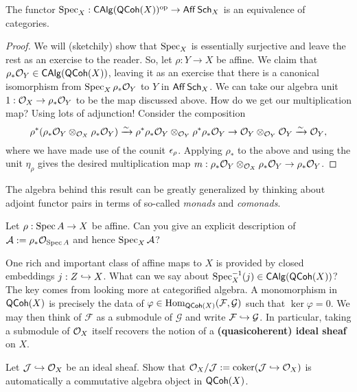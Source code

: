 \documentclass[11pt]{article}
\renewcommand{\AA}{\mathcal{A}}
\renewcommand{\F}{\mathcal{F}}
\newcommand{\G}{\mathcal{G}}
\newcommand{\J}{\mathcal{J}}
\renewcommand{\phi}{\varphi}
\begin{document}
\begin{theorem}
The functor $\operatorname{Spec}_X: \operatorname{\mathsf{CAlg}}(\operatorname{\mathsf{QCoh}}(X))^{\operatorname{op}}\to\operatorname{\mathsf{Aff}}\operatorname{\mathsf{Sch}}_X$ is an equivalence of categories.
\end{theorem}

\begin{proof}
We will (sketchily) show that $\operatorname{Spec}_X$ is essentially surjective and leave the rest as an exercise to the reader. So, let $\rho: Y\to X$ be affine. We claim that $\rho_*\mathcal{O}_Y\in\operatorname{\mathsf{CAlg}}(\operatorname{\mathsf{QCoh}}(X))$, leaving it as an exercise that there is a canonical isomorphism from $\operatorname{Spec}_X\rho_*\mathcal{O}_Y$ to $Y$ in $\operatorname{\mathsf{Aff}}\operatorname{\mathsf{Sch}}_X$. We can take our algebra unit $1: \mathcal{O}_X\to\rho_*\mathcal{O}_Y$ to be the map discussed above. How do we get our multiplication map? Using lots of adjunction! Consider the composition
$$\rho^*(\rho_*\mathcal{O}_Y\otimes_{\mathcal{O}_X}\rho_*\mathcal{O}_Y)\xrightarrow{\sim}\rho^*\rho_*\mathcal{O}_Y\otimes_{\mathcal{O}_Y}\rho^*\rho_*\mathcal{O}_Y\to\mathcal{O}_Y\otimes_{\mathcal{O}_Y}\mathcal{O}_Y\xrightarrow{\sim}\mathcal{O}_Y,$$
where we have made use of the counit $\epsilon_{\rho}$. Applying $\rho_*$ to the above and using the unit $\eta_{\rho}$ gives the desired multiplication map $m: \rho_*\mathcal{O}_Y\otimes_{\mathcal{O}_X}\rho_*\mathcal{O}_Y\to\rho_*\mathcal{O}_Y$.
\end{proof}

\begin{remark}
The algebra behind this result can be greatly generalized by thinking about adjoint functor pairs in terms of so-called \emph{monads} and \emph{comonads}.
\end{remark}

\begin{exercise}
Let $\rho: \operatorname{Spec} A\to X$ be affine. Can you give an explicit description of $\AA:=\rho_*\O_{\Spec A}$ and hence $\Spec_X\AA$? 
\end{exercise}

One rich and important class of affine maps to $X$ is provided by closed embeddings $j: Z\hookrightarrow X$. What can we say about $\operatorname{Spec}_X^{-1}(j)\in\operatorname{\mathsf{CAlg}}(\operatorname{\mathsf{QCoh}}(X))$? The key comes from looking more at categorified algebra. A monomorphism in $\operatorname{\mathsf{QCoh}}(X)$ is precisely the data of $\phi\in\Hom_{\QCoh(X)}(\F,\G)$ such that $\ker\phi=0$. We may then think of $\F$ as a submodule of $\G$ and write $\F\inj\G$. In particular, taking a submodule of $\mathcal{O}_X$ itself recovers the notion of a \textbf{(quasicoherent) ideal sheaf} on $X$.

\begin{exercise}
Let $\J\inj\O_X$ be an ideal sheaf. Show that $\O_X/\J:=\coker(\J\inj\O_X)$ is automatically a commutative algebra object in $\operatorname{\mathsf{QCoh}}(X)$.
\end{exercise}
\end{document}
